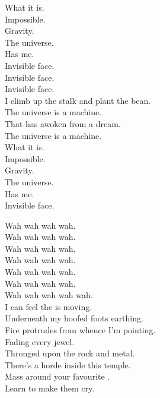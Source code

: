 What it is. \\
Impossible. \\
Gravity. \\
The universe. \\
Has me. \\
Invisible face. \\

Invisible face. \\
Invisible face. \\

I climb up the stalk and plant the bean. \\
The universe is a machine. \\
That has awoken from a dream. \\
The universe is a machine. \\

What it is. \\
Impossible. \\
Gravity. \\
The universe. \\
Has me. \\
Invisible face. \\




Wah wah wah wah. \\
Wah wah wah wah. \\
Wah wah wah wah. \\
Wah wah wah wah. \\

Wah wah wah wah. \\
Wah wah wah wah. \\
Wah wah wah wah wah. \\

I can feel the  is moving. \\
Underneath my hoofed foots earthing. \\
Fire protrudes from whence I'm pointing. \\
Fading every jewel. \\

Thronged upon the rock and metal. \\
There's a horde inside this temple. \\
Mass around your favourite . \\
Learn to make them cry. \\

